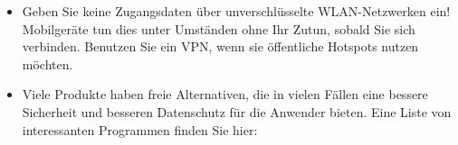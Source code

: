 \documentclass[10pt,foldmark,tumble]{leaflet}
\newcommand{\barcode}[1]{
\begin{pspicture}(1cm,1cm) 
\psbarcode[scalex=0.4,scaley=0.4]{#1}{}{qrcode} 
\end{pspicture}
}
\begin{document}
\begin{itemize}
  
 \item Geben Sie keine Zugangsdaten über unverschlüsselte WLAN-Netzwerken ein! Mobilgeräte tun
 dies unter Umständen ohne Ihr Zutun, sobald Sie sich verbinden. Benutzen Sie ein VPN, wenn sie 
 öffentliche Hotspots nutzen möchten.

 \item Viele Produkte haben freie Alternativen, die in vielen Fällen eine bessere Sicherheit
 und besseren Datenschutz für die Anwender bieten. Eine Liste von interessanten Programmen finden
 Sie hier:
\end{itemize}
 
\end{document}
